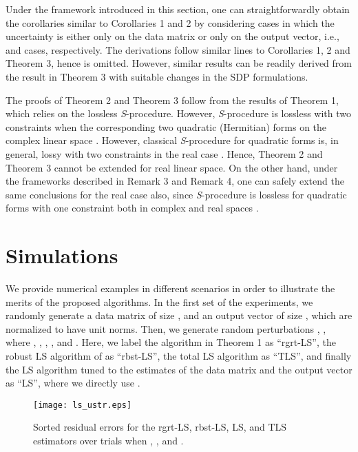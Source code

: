 \documentclass[review,sort&compress]{elsarticle}
\begin{document}
\begin{rmk}
Under the framework introduced in this section, one can straightforwardly obtain the corollaries similar to Corollaries 1 and 2 by considering cases in which the uncertainty is either only on the data matrix or only on the output vector, i.e.,  and  cases, respectively. The derivations follow similar lines to Corollaries 1, 2 and Theorem 3, hence is omitted. However, similar results can be readily derived from the result in Theorem 3 with suitable changes in the SDP formulations.
\end{rmk}

\begin{rmk}
The proofs of Theorem 2 and Theorem 3 follow from the results of Theorem 1, which relies on the lossless {\em S}-procedure. However, {\em S}-procedure is lossless with two constraints when the corresponding two quadratic (Hermitian) forms on the complex linear space \cite{s1}. However, classical {\em S}-procedure for quadratic forms is, in general, lossy with two constraints in the real case \cite{s2}. Hence, Theorem 2 and Theorem 3 cannot be extended for real linear space. On the other hand, under the frameworks described in Remark 3 and Remark 4, one can safely extend the same conclusions for the real case also, since {\em S}-procedure is lossless for quadratic forms with one constraint both in complex and real spaces \cite{huang1,huang2}.
\end{rmk}

\section{Simulations}\label{sec:numer}
We provide numerical examples in different scenarios in order to illustrate the merits of the proposed algorithms. In the first set of the experiments, we randomly generate a data matrix of size , and an output vector of size , which are normalized to have unit norms. Then, we generate  random perturbations , , where , , , , and . Here, we label the algorithm in Theorem 1 as ``rgrt-LS'', the robust LS algorithm of \cite{Ghaoui97} as ``rbst-LS'', the total LS algorithm \cite{Ghaoui97} as ``TLS'', and finally the LS algorithm tuned to the estimates of the data matrix and the output vector as ``LS'', where we directly use .

\begin{figure}[t]
  \centering
  \texttt{[image: ls\_ustr.eps]}\\
  \caption{Sorted residual errors for the rgrt-LS, rbst-LS, LS, and TLS estimators over  trials when , , and .}\label{fig:ls_ustr}
\end{figure}
\end{document}
